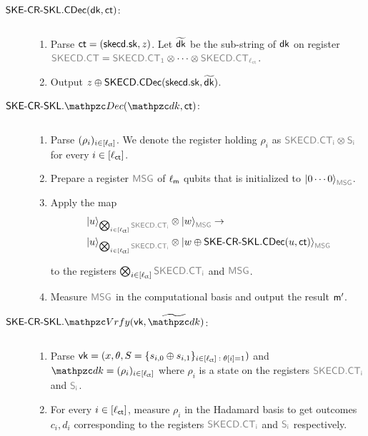 \begin{description}
\begin{enumerate}
\end{enumerate}

\item[$\mathsf{SKE}\textrm{-}\mathsf{CR}\textrm{-}\mathsf{SKL}.\mathsf{CDec}(\mathsf{dk}, \mathsf{ct})$:] $ $
\begin{enumerate}
\item Parse $\mathsf{ct} = (\mathsf{skecd}.\mathsf{sk}, z)$. Let
$\widetilde{\mathsf{dk}}$ be the sub-string of $\mathsf{dk}$ on register
$\qreg{SKECD.CT} = \qreg{SKECD.CT_1} \otimes \cdots \otimes \qreg{SKECD.CT_{\ctlen}}$.
\item Output $z \oplus \mathsf{SKECD}.\mathsf{CDec}(\mathsf{skecd}.\mathsf{sk}, \widetilde{\mathsf{dk}})$.
\end{enumerate}

\item[$\SKECRSKL.\qDec(\qdk, \ct)$:] $ $
\begin{enumerate}
\item Parse $(\rho_i)_{i \in [\ell_{\mathsf{ct}}]}$. We denote the register
holding $\rho_i$ as $\qreg{SKECD.CT_i}\tensor\qreg{S_i}$ for
every $i\in[\ell_{\mathsf{ct}}]$.

\item Prepare a register $\qreg{MSG}$ of $\ell_{\mathsf{m}}$ qubits that is
initialized to $\ket{0\cdots0}_{\qreg{MSG}}$.

\item Apply the map
\begin{align}
&\ket{u}_{\bigotimes_{i\in[\ctlen]}\qreg{SKECD.
CT_i}} \tensor\ket{w}_{\qreg{MSG}} \ra\\
&\ket{u}_{\bigotimes_{i\in[\ctlen]}\qreg{SKECD.CT_i}}\tensor\ket{w\oplus
\SKECRSKL.\CDec(u, \ct)}_{\qreg{MSG}}
\end{align}

to the registers
$\bigotimes_{i\in[\ctlen]}\qreg{SKECD.CT_i}$ and
$\qreg{MSG}$.
\item Measure $\qreg{MSG}$ in the computational basis and output the result $\mathsf{m}^\prime$.
\end{enumerate}

\item[$\SKECRSKL.\qVrfy(\vk,\widetilde{\qdk})$:] $ $
\begin{enumerate}
\item Parse $\mathsf{vk} = (x,\theta,S=\{s_{i,0} \oplus
    s_{i,1}\}_{i\in[\ell_{\mathsf{ct}}]\; : \; \theta[i]=1})$ and
    $\qdk = (\rho_i)_{i\in[\ctlen]}$ where $\rho_i$ is a state on
    the registers $\qreg{SKECD.CT_i}$ and $\qreg{S_i}$.
\item For every $i \in [\ell_{\mathsf{ct}}]$, measure $\rho_i$ in the Hadamard
basis to get outcomes $c_i, d_i$ corresponding to 
the registers $\qreg{SKECD.CT_i}$ and $\qreg{S_i}$ respectively.


\end{enumerate}
\end{description}
